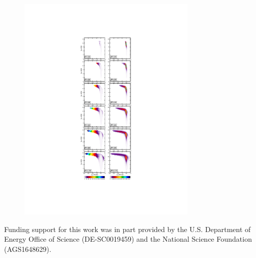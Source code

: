 \documentclass[times]{qjrms4}
\begin{document}
\begin{figure}[t]
\begin{center}
\noindent\includegraphics[width=20pc,angle=0]{figs/temp_pdecomp.pdf}\\
\end{center}
\caption{}
\label{fig:profiles}
\end{figure}

\ack 
Funding support for this work was in part provided by the U.S. Department of Energy Office of Science (DE-SC0019459) and the National Science Foundation (AGS1648629).



\end{document}
